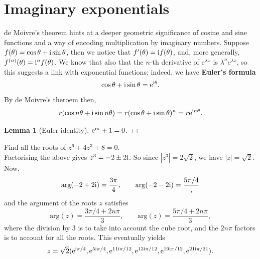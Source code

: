 \documentclass[letter-paper]{tufte-book}
\newtheorem{lemma}[theorem]{\color{pastel-blue}Lemma}
\newenvironment{example}[1][Example]{\begin{trivlist}
\item[\hskip \labelsep {\bfseries #1}]}{\end{trivlist}}
\newcommand{\ex}{\mathrm{e}}
\newcommand{\zi}{{\rm i}}
\newcommand\Def[1]{\textbf{#1}}
\newcommand{\qedwhite}{\hfill \ensuremath{\Box}}
\begin{document}

\section{Imaginary exponentials}

de Moivre's theorem hints at a deeper geometric significance of cosine and sine
functions and a way of encoding multiplication by imaginary numbers. Suppose
$f(\theta)=\cos\theta+\zi\sin\theta$, then we notice that $f'(\theta)=\zi
f(\theta)$, and, more generally, $f^{(n)}(\theta)=\zi^n f(\theta)$. We know that
also that the $n$-th derivative of $\ex^{\lambda x}$ is $\lambda^n\ex^{\lambda
x}$, so this suggests a link with exponential functions; indeed, we have
\Def{Euler's formula}
\begin{equation}
	\cos\theta+\zi\sin\theta=\ex^{\zi\theta}.
\end{equation}
By de Moivre's theroem then,
\begin{equation*}
	r(\cos n\theta+\zi\sin n\theta)=r(\cos\theta+\zi\sin\theta)^n
	=r\ex^{\zi n\theta}.
\end{equation*}
\begin{lemma}[Euler identity]
	$\ex^{\zi\pi}+1=0$. \qedwhite
\end{lemma}
\begin{example}
	Find all the roots of $z^6+4z^3+8=0$.\\
	
	Factorising the above gives $z^3=-2\pm2\zi$. So since $|z^3|=2\sqrt{2}$, we
	have $|z|=\sqrt{2}$. Now,
	\begin{equation*}
		\mbox{arg}(-2+2\zi)=\frac{3\pi}{4},\qquad
		\mbox{arg}(-2-2\zi)=\frac{5\pi/4},
	\end{equation*}
	and the argument of the roots $z$ satisfies
	\begin{equation*}
		\mbox{arg}(z)=\frac{3\pi/4 + 2n\pi}{3},\qquad
		\mbox{arg}(z)=\frac{5\pi/4 + 2n\pi}{3},
	\end{equation*}
	where the division by $3$ is to take into account the cube root, and the
	$2n\pi$ factors is to account for all the roots. This eventually yields
	\begin{equation*}
		z=\sqrt{2}(\ex^{\zi\pi/4}, \ex^{5\zi\pi/4}, \ex^{11\zi\pi/12},
		\ex^{13\zi\pi/12}, \ex^{19\zi\pi/12}, \ex^{21\zi\pi/21}).
	\end{equation*}
\end{example}

\end{document}

